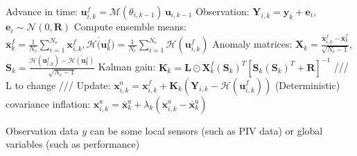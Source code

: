 \begin{algorithm}[!ht]
\begin{algorithmic}[1]
                \State Advance in time: $\boldsymbol{u}_{i,k}^f = \mathcal{M}(\theta_{i,k-1})\,\boldsymbol{u}_{i,k-1}$
                \State Observation: $\boldsymbol{Y}_{i,k} = \boldsymbol{y}_k + \boldsymbol{e}_i$, $\boldsymbol{e}_i \sim \mathcal{N}(0,\boldsymbol{R})$
                \State Compute ensemble means: $\boldsymbol{\overline{x}}_k^{f} = \frac{1}{N_e}\sum_{i=1}^{N_e}\boldsymbol{x}_{i,k}^{f}, \overline{\mathcal{H}(\boldsymbol{u}^f_k}) = \frac{1}{N_e}\sum_{i = 1}^{N_e} \mathcal{H}(\boldsymbol{u}_{i,k}^f)$
                \State Anomaly matrices: $\boldsymbol{X}_k = \frac{\boldsymbol{x}_{i,k}^{f} - \boldsymbol{\overline{x}}_k^{f}}{\sqrt{N_e - 1}}$,\,$\boldsymbol{S}_k = \frac{\mathcal{H}(\boldsymbol{u}_{i,k}^f) - \overline{\mathcal{H}(\boldsymbol{u}^f_k)}}{\sqrt{N_e-1}}$
                \State Kalman gain: $\boldsymbol{K}_k = \boldsymbol{L} \odot \boldsymbol{X}_k^f(\boldsymbol{S}_k)^T [\boldsymbol{S}_k(\boldsymbol{S}_k)^T + \boldsymbol{R}]^{-1}$ /// L to change ///
                \State Update: $\boldsymbol{x}_{i,k}^{a} = \boldsymbol{x}_{i,k}^{f} + \boldsymbol{K}_k (\boldsymbol{Y}_{i,k} - \mathcal{H}(\boldsymbol{u}_{i,k}^f))$
                \State (Deterministic) covariance inflation: $\boldsymbol{x}_{i,k}^{a} = \boldsymbol{\overline{x}}_k^{a} + \lambda_k (\boldsymbol{x}_{i,k}^{a} - \boldsymbol{\overline{x}}_k^{a})$
            \EndFor
        \EndFor
    \end{algorithmic}
\end{algorithm}

Observation data $y$ can be some local sensors (such as PIV data) or global variables (such as performance)

